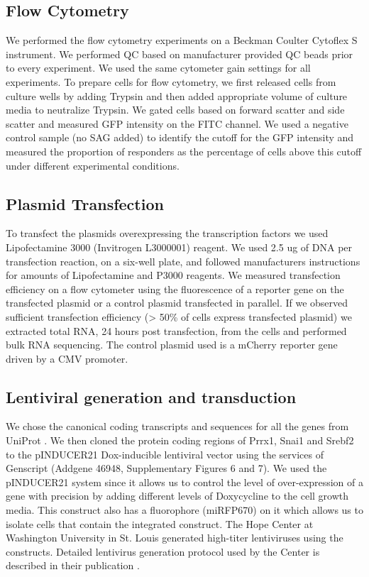 \subsection{Flow Cytometry}
We performed the flow cytometry experiments on a Beckman Coulter Cytoflex S instrument. We performed QC based on manufacturer provided QC beads prior to every experiment. We used the same cytometer gain settings for all experiments. To prepare cells for flow cytometry, we first released cells from culture wells by adding Trypsin and then added appropriate volume of culture media to neutralize Trypsin. We gated cells based on forward scatter and side scatter and measured GFP intensity on the FITC channel. We used a negative control sample (no SAG added) to identify the cutoff for the GFP intensity and measured the proportion of responders as the percentage of cells above this cutoff under different experimental conditions.

\subsection{Plasmid Transfection}
To transfect the plasmids overexpressing the transcription factors we used Lipofectamine 3000 (Invitrogen L3000001) reagent. We used 2.5 ug of DNA per transfection reaction, on a six-well plate, and followed manufacturers instructions for amounts of Lipofectamine and P3000 reagents. We measured transfection efficiency on a flow cytometer using the fluorescence of a reporter gene on the transfected plasmid or a control plasmid transfected in parallel. If we observed sufficient transfection efficiency (> 50\% of cells express transfected plasmid) we extracted total RNA, 24 hours post transfection, from the cells and performed bulk RNA sequencing. The control plasmid used is a mCherry reporter gene driven by a CMV promoter.

\subsection{Lentiviral generation and transduction}
We chose the canonical coding transcripts and sequences for all the genes from UniProt \cite{noauthor_2021-be}. We then cloned the protein coding regions of Prrx1, Snai1 and Srebf2 to the pINDUCER21 Dox-inducible lentiviral vector \cite{Meerbrey2011-ew} using the services of Genscript (Addgene 46948, Supplementary Figures 6 and 7). We used the pINDUCER21 system since it allows us to control the level of over-expression of a gene with precision by adding different levels of Doxycycline to the cell growth media. This construct also has a fluorophore (miRFP670) on it which allows us to isolate cells that contain the integrated construct. The Hope Center at Washington University in St. Louis generated high-titer lentiviruses using the constructs. Detailed lentivirus generation protocol used by the Center is described in their publication \cite{Li2012-if}.

